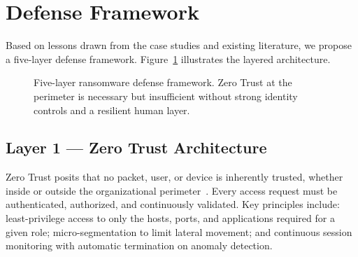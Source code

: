 \documentclass[sigconf,nonacm]{acmart}
\begin{document}
\section{Defense Framework}

Based on lessons drawn from the case studies and existing literature, we propose a
five-layer defense framework. Figure~\ref{fig:defense} illustrates the layered
architecture.

\begin{figure}[h]
\centering
{}
\caption{Five-layer ransomware defense framework. Zero Trust at the perimeter is
  necessary but insufficient without strong identity controls and a resilient human
  layer.}
\label{fig:defense}
\end{figure}

\subsection{Layer 1 — Zero Trust Architecture}

Zero Trust posits that no packet, user, or device is inherently trusted, whether inside
or outside the organizational perimeter~\cite{saeed2020}. Every access request must be
authenticated, authorized, and continuously validated. Key principles include:
least-privilege access to only the hosts, ports, and applications required for a given
role; micro-segmentation to limit lateral movement; and continuous session monitoring
with automatic termination on anomaly detection.
\end{document}
